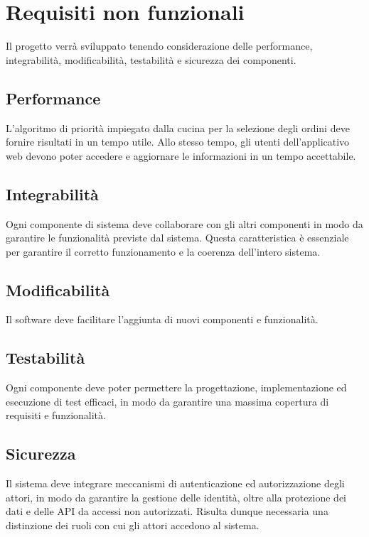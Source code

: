 \section{Requisiti non funzionali}
Il progetto verrà sviluppato tenendo considerazione delle performance, integrabilità, modificabilità, testabilità e sicurezza dei componenti.

\subsection{Performance}
L'algoritmo di priorità impiegato dalla cucina per la selezione degli ordini deve fornire risultati in un tempo utile. Allo stesso tempo, gli utenti dell'applicativo web devono poter accedere e aggiornare le informazioni in un tempo accettabile.

\subsection{Integrabilità}
Ogni componente di sistema deve collaborare con gli altri componenti in modo da garantire le funzionalità previste dal sistema. Questa caratteristica è essenziale per garantire il corretto funzionamento e la coerenza dell'intero sistema.

\subsection{Modificabilità}
Il software deve facilitare l’aggiunta di nuovi componenti e funzionalità.

\subsection{Testabilità}
Ogni componente deve poter permettere la progettazione, implementazione ed esecuzione di test efficaci, in modo da garantire una massima copertura di requisiti e funzionalità.

\subsection{Sicurezza}
Il sistema deve integrare meccanismi di autenticazione ed autorizzazione degli attori, in modo da garantire la gestione delle identità, oltre alla protezione dei dati e delle API da accessi non autorizzati. Risulta dunque necessaria una distinzione dei ruoli con cui gli attori accedono al sistema.

\clearpage